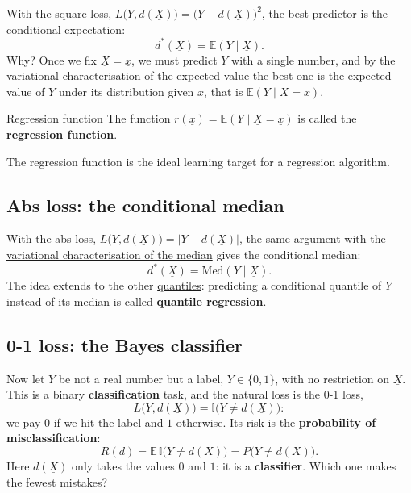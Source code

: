 \documentclass[a4paper,12pt,oneside]{report}
\begin{document}
With the square loss, $L\big(Y,d(\underline{X})\big)=\big(Y-d(\underline{X})\big)^2$,
the best predictor is the conditional expectation:
\[
d^*(\underline{X})=\mathbb{E}(Y\mid\underline{X}).
\]
Why? Once we fix $\underline{X}=\underline{x}$, we must predict $Y$ with a
single number, and by the
\hyperref[prop:mse]{variational characterisation of the expected value}
the best one is the expected value of $Y$ under its distribution given
$\underline{x}$, that is $\mathbb{E}(Y\mid\underline{X}=\underline{x})$.

\begin{frameddefn}{Regression function}\label{def:regression-function}
The function $r(\underline{x})=\mathbb{E}(Y\mid\underline{X}=\underline{x})$
is called the \textbf{regression function}.
\end{frameddefn}

The regression function is the ideal learning target for a regression
algorithm.

\subsection{Abs loss: the conditional median}

With the abs loss, $L\big(Y,d(\underline{X})\big)=\big|Y-d(\underline{X})\big|$,
the same argument with the
\hyperref[prop:mae]{variational characterisation of the median} gives the
conditional median:
\[
d^*(\underline{X})=\mathrm{Med}(Y\mid\underline{X}).
\]
The idea extends to the other \hyperref[sec:median]{quantiles}: predicting
a conditional quantile of $Y$ instead of its median is called
\textbf{quantile regression}.

\subsection{0-1 loss: the Bayes classifier}

Now let $Y$ be not a real number but a label, $Y\in\{0,1\}$, with no
restriction on $\underline{X}$. This is a binary \textbf{classification}
task, and the natural loss is the 0-1 loss,
\[
L\big(Y,d(\underline{X})\big)=\mathbb{I}\big(Y\neq d(\underline{X})\big):
\]
we pay $0$ if we hit the label and $1$ otherwise. Its risk is the
\textbf{probability of misclassification}:
\[
R(d)=\mathbb{E}\,\mathbb{I}\big(Y\neq d(\underline{X})\big)=P\big(Y\neq d(\underline{X})\big).
\]
Here $d(\underline{X})$ only takes the values $0$ and $1$: it is a
\textbf{classifier}. Which one makes the fewest mistakes?
\end{document}
